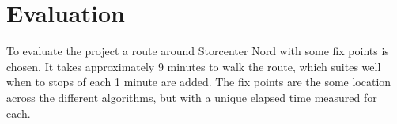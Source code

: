 \section{Evaluation}
To evaluate the project a route around Storcenter Nord with some fix points is chosen. It takes approximately 9 minutes to walk the route, which suites well when to stops of each 1 minute are added. The fix points are the some location across the different algorithms, but with a unique elapsed time measured for each.





